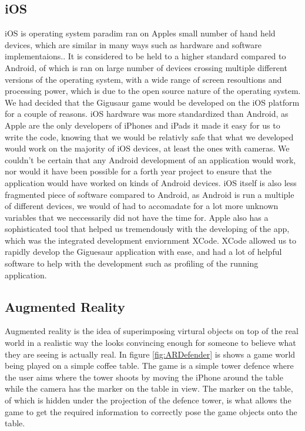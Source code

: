 \documentclass{article}
\begin{document}
\subsection{iOS} %
iOS is operating system paradim ran on Apples small number of hand held devices, which are similar in many ways such as hardware and software implementaions.. It is considered to be held to a higher standard compared to Android, of which is ran on large number of devices crossing multiple different versions of the operating system, with a wide range of screen resoultions and processing power, which is due to the open source nature of the operating system. We had decided that the Gigusaur game would be developed on the iOS platform for a couple of reasons. iOS hardware was more standardized than Android, as Apple are the only developers of iPhones and iPads it made it easy for us to write the code, knowing that we would be relativly safe that what we developed would work on the majority of iOS devices, at least the ones with cameras. We couldn't be certain that any Android development of an application would work, nor would it have been possible for a forth year project to ensure that the application would have worked on kinds of Android devices. iOS itself is also less fragmented piece of software compared to Android, as Android is run a multiple of different devices, we would of had to accomadate for a lot more unknown variables that we neccessarily did not have the time for. Apple also has a sophisticated tool that helped us tremendously with the developing of the app, which was the integrated development enviornment XCode. XCode allowed us to rapidly develop the Giguesaur application with ease, and had a lot of helpful software to help with the development such as profiling of the running application.

\subsection{Augmented Reality}
Augmented reality is the idea of superimposing virtural objects on top of the real world in a realistic way the looks convincing enough for someone to believe what they are seeing is actually real. In figure \ref{fig:ARDefender} is shows a game world being played on a simple coffee table. The game is a simple tower defence where the user aims where the tower shoots by moving the iPhone around the table while the camera has the marker on the table in view. The marker on the table, of which is hidden under the projection of the defence tower, is what allows the game to get the required information to correctly pose the game objects onto the table.
\end{document}
